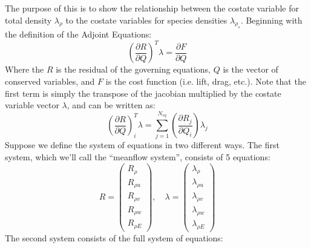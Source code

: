 \documentclass{article}   	%
\begin{document}
The purpose of this is to show the relationship between the costate variable for total density $\lambda_\rho$ to the costate variables for species densities $\lambda_{\rho_s}$. Beginning with the definition of the Adjoint Equations:
\begin{equation}
  \left(\frac{\partial R}{\partial Q}\right)^T\lambda = \frac{\partial F}{\partial Q}
  \label{adj_eqn}
\end{equation}
Where the $R$ is the residual of the governing equations, $Q$ is the vector of conserved variables, and $F$ is the cost function (i.e. lift, drag, etc.). Note that the first term is simply the transpose of the jacobian multiplied by the costate variable vector $\lambda$, and can be written as:
\begin{equation}
  \left(\frac{\partial R}{\partial Q}\right)_i^T \lambda 
  = \sum_{j=1}^{N_{eq}}{
    \left(\frac{\partial R_j}{\partial Q_i}\right) \lambda_j}
  \label{lhs_sum}
\end{equation}
Suppose we define the system of equations in two different ways.  The first system, which we'll call the ``meanflow system'', consists of 5 equations:
\begin{equation}
  R = \begin{pmatrix} 
        R_{\rho} \\ R_{\rho u} \\ R_{\rho v} \\ R_{\rho w} \\ R_{\rho E}
      \end{pmatrix}, \quad
      \lambda = \begin{pmatrix}
        \lambda_\rho \\ \lambda_{\rho u} \\ \lambda_{\rho v} \\ \lambda_{\rho w} \\
        \lambda_{\rho E}
      \end{pmatrix}
  \label{5x5}
\end{equation}
The second system consists of the full system of equations:
\end{document}

